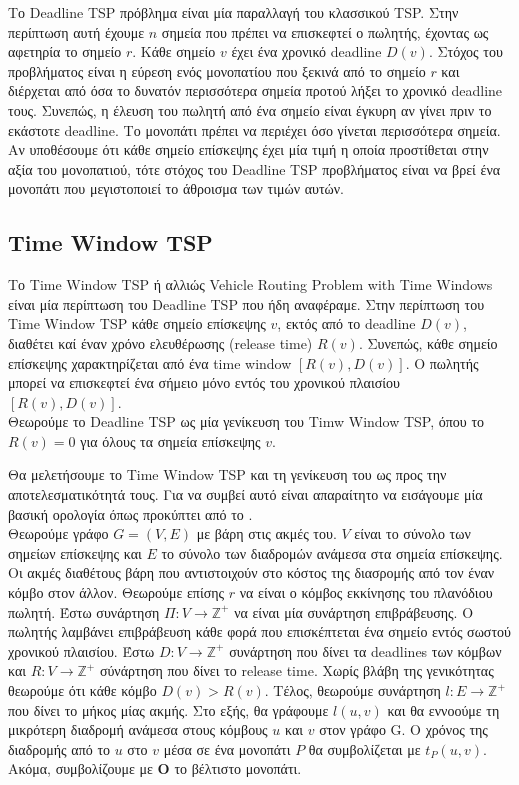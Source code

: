 \documentclass[oneside,12pt]{book}
\theoremstyle{definition}
\begin{document}
Το Deadline TSP πρόβλημα είναι μία παραλλαγή του κλασσικού TSP. Στην περίπτωση αυτή έχουμε \(n\) σημεία που πρέπει να επισκεφτεί ο πωλητής, έχοντας ως αφετηρία το σημείο \(r\). Κάθε σημείο \(v\) έχει ένα χρονικό deadline \(D(v)\). Στόχος του προβλήματος είναι η εύρεση ενός μονοπατίου που ξεκινά από το σημείο \(r\) και διέρχεται από όσα το δυνατόν περισσότερα σημεία προτού λήξει το χρονικό deadline τους. Συνεπώς, η έλευση του πωλητή από ένα σημείο είναι έγκυρη αν γίνει πριν το εκάστοτε deadline. Το μονοπάτι πρέπει να περιέχει όσο γίνεται περισσότερα σημεία. Αν υποθέσουμε ότι κάθε σημείο επίσκεψης έχει μία τιμή η οποία προστίθεται στην αξία του μονοπατιού, τότε στόχος του Deadline TSP προβλήματος είναι να βρεί ένα μονοπάτι που μεγιστοποιεί το άθροισμα των τιμών αυτών. \\

\subsection{Time Window TSP} 

Το Time Window TSP ή αλλιώς Vehicle Routing Problem with Time Windows είναι μία περίπτωση του Deadline TSP  που ήδη αναφέραμε. Στην περίπτωση του Time Window TSP κάθε σημείο επίσκεψης \(v\), εκτός από το deadline \(D(v)\), διαθέτει καί έναν χρόνο ελευθέρωσης (release time) \(R(v)\). Συνεπώς, κάθε σημείο επίσκεψης χαρακτηρίζεται από ένα time window \([R(v), D(v)]\). Ο πωλητής μπορεί να επισκεφτεί ένα σήμειο μόνο εντός του χρονικού πλαισίου \([R(v), D(v)]\). \\

Θεωρούμε το Deadline TSP ως μία γενίκευση του Timw Window TSP, όπου το \(R(v) = 0\) για όλους τα σημεία επίσκεψης \(v\).

Θα μελετήσουμε το Time Window TSP και τη γενίκευση του ως προς την αποτελεσματικότητά τους. Για να συμβεί αυτό είναι απαραίτητο να εισάγουμε μία βασική ορολογία όπως προκύπτει από το \cite{12}. \\

Θεωρούμε γράφο \(G = (V,E)\) με βάρη στις ακμές του. \(V\) είναι το σύνολο των σημείων επίσκεψης και \(E\) το σύνολο των διαδρομών ανάμεσα στα σημεία επίσκεψης. Οι ακμές διαθέτους βάρη που αντιστοιχούν στο κόστος της διασρομής από τον έναν κόμβο στον άλλον. Θεωρούμε επίσης \(r\) να είναι ο κόμβος εκκίνησης του πλανόδιου πωλητή. Έστω συνάρτηση \(Π: V \rightarrow \mathbb{Z}^+\) να είναι μία συνάρτηση επιβράβευσης. Ο πωλητής λαμβάνει επιβράβευση κάθε φορά που επισκέπτεται ένα σημείο εντός σωστού χρονικού πλαισίου. Έστω \(D: V \rightarrow \mathbb{Z}^+\) συνάρτηση που δίνει τα deadlines των κόμβων και \(R: V \rightarrow \mathbb{Z}^+\) σύνάρτηση που δίνει το release time. Χωρίς βλάβη της γενικότητας θεωρούμε ότι κάθε κόμβο \(D(v) > R(v)\). Τέλος, θεωρούμε συνάρτηση \(l: E \rightarrow \mathbb{Z}^+\) που δίνει το μήκος μίας ακμής. Στο εξής, θα γράφουμε \(l(u,v)\) και θα εννοούμε τη μικρότερη διαδρομή ανάμεσα στους κόμβους \(u\) και \(v\) στον γράφο G. Ο χρόνος της διαδρομής από το \(u\) στο \(v\) μέσα σε ένα μονοπάτι \(P\) θα συμβολίζεται με \(t_P(u,v)\). Ακόμα, συμβολίζουμε με \(\mathbf{O}\) το βέλτιστο μονοπάτι. \\
\end{document}

